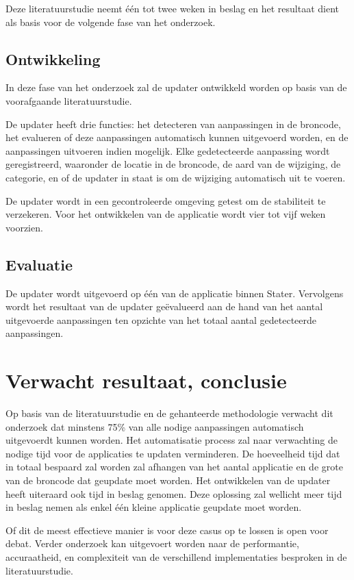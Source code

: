 Deze literatuurstudie neemt één tot twee weken in beslag en het resultaat dient als basis voor de volgende fase van het onderzoek.

\subsection{Ontwikkeling}

In deze fase van het onderzoek zal de updater ontwikkeld worden op basis van de voorafgaande literatuurstudie.

De updater heeft drie functies: het detecteren van aanpassingen in de broncode, het evalueren of deze aanpassingen automatisch kunnen uitgevoerd worden, en de aanpassingen uitvoeren indien mogelijk.
Elke gedetecteerde aanpassing wordt geregistreerd, waaronder de locatie in de broncode, de aard van de wijziging, de categorie, en of de updater in staat is om de wijziging automatisch uit te voeren.

De updater wordt in een gecontroleerde omgeving getest om de stabiliteit te verzekeren.
Voor het ontwikkelen van de applicatie wordt vier tot vijf weken voorzien.

\subsection{Evaluatie}

De updater wordt uitgevoerd op één van de applicatie binnen Stater.
Vervolgens wordt het resultaat van de updater geëvalueerd aan de hand van het aantal uitgevoerde aanpassingen ten opzichte van het totaal aantal gedetecteerde aanpassingen.

\section{Verwacht resultaat, conclusie}
\label{sec:verwachte_resultaten}

Op basis van de literatuurstudie en de gehanteerde methodologie verwacht dit onderzoek dat minstens 75\% van alle nodige aanpassingen automatisch uitgevoerdt kunnen worden.
Het automatisatie process zal naar verwachting de nodige tijd voor de applicaties te updaten verminderen.
De hoeveelheid tijd dat in totaal bespaard zal worden zal afhangen van het aantal applicatie en de grote van de broncode dat geupdate moet worden.
Het ontwikkelen van de updater heeft uiteraard ook tijd in beslag genomen.
Deze oplossing zal wellicht meer tijd in beslag nemen als enkel één kleine applicatie geupdate moet worden.

Of dit de meest effectieve manier is voor deze casus op te lossen is open voor debat.
Verder onderzoek kan uitgevoert worden naar de performantie, accuraatheid, en complexiteit van de verschillend implementaties besproken in de literatuurstudie.

